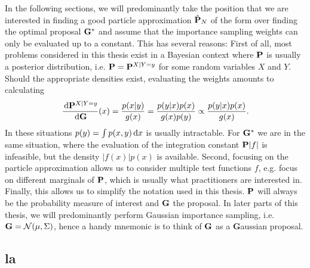 In the following sections, we will predominantly take the position that we are interested in finding a good particle approximation $\hat\P_{N}$ of the form  over finding the optimal proposal $\G^{\ast}$  and assume that the importance sampling weights can only be evaluated up to a constant. 
This has several reasons: First of all, most problems considered in this thesis exist in a Bayesian context where $\P$ is usually a posterior distribution, i.e. $\P = \P^{X|Y=y}$ for some random variables $X$ and $Y$. Should the appropriate densities exist, evaluating the weights amounts to calculating 
$$
\rnd{\P^{X| Y= y}}{\G}(x) = \frac{p(x|y)}{g(x)} = \frac{p(y|x)p(x)}{g(x)p(y)} \propto \frac{p(y|x)p(x)}{g(x)}.
$$
In these situations $p(y) = \int p(x,y)\d x$ is usually intractable. For $\G^{\ast}$ we are in the same situation, where the evaluation of the integration constant $\P \lvert f \rvert$ is infeasible, but the density $\lvert f(x)\rvert p(x)$ is available.
Second, focusing on the particle approximation allows us to consider multiple test functions $f$, e.g. focus on different marginals of $\P$, which is usually what practitioners are interested in. 
Finally, this allows us to simplify the notation used in this thesis. $\P$ will always be the probability measure of interest and $\G$ the proposal. In later parts of this thesis, we will predominantly perform Gaussian importance sampling, i.e. $\G = \mathcal N(\mu, \Sigma)$, hence a handy mnemonic is to think of $\G$ as a \textbf{G}aussian proposal.

\subsection{\texorpdfstring{\Acrfull{la}}{Laplace approximation}}
\label{subsec:la}

